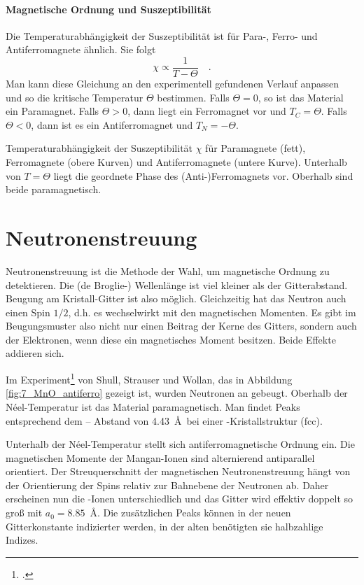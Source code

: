 \paragraph*{Magnetische Ordnung und Suszeptibilität} Die Temperaturabhängigkeit der Suszeptibilität ist für Para-, Ferro- und Antiferromagnete ähnlich. Sie folgt 
\begin{equation}
    \chi \propto \frac{1}{T - \Theta} \quad .
\end{equation}
Man kann diese Gleichung an den experimentell gefundenen Verlauf anpassen und so die kritische Temperatur  $\Theta$ bestimmen. Falls $\Theta = 0$, so ist das Material ein Paramagnet. Falls $\Theta > 0$, dann liegt ein Ferromagnet vor und $T_C = \Theta$. Falls $\Theta < 0$, dann ist es ein Antiferromagnet und $T_N = - \Theta$. 


\begin{marginfigure}
    \caption{Temperaturabhängigkeit der Suszeptibilität $\chi$ für Paramagnete (fett), Ferromagnete (obere Kurven) und Antiferromagnete (untere Kurve). Unterhalb von $T=\Theta$ liegt die geordnete Phase des (Anti-)Ferromagnets vor. Oberhalb sind beide paramagnetisch.}
\end{marginfigure}
    

\section{Neutronenstreuung}

 Neutronenstreuung ist die Methode der Wahl, um magnetische Ordnung zu detektieren. Die (de Broglie-) Wellenlänge ist viel kleiner als der Gitterabstand. Beugung am Kristall-Gitter ist also möglich. Gleichzeitig hat das Neutron auch einen Spin $1/2$, d.h. es wechselwirkt mit den magnetischen Momenten. Es gibt im Beugungsmuster also nicht nur einen Beitrag der Kerne des Gitters, sondern auch der Elektronen, wenn diese ein magnetisches Moment besitzen. Beide Effekte addieren sich.

Im Experiment\footcite{Shull1951} von  Shull, Strauser und Wollan, das in Abbildung \ref{fig:7_MnO_antiferro} gezeigt ist, wurden Neutronen an  gebeugt. Oberhalb der Néel-Temperatur ist das Material paramagnetisch. Man findet Peaks entsprechend dem -- Abstand von 4.43~\AA\ bei einer -Kristallstruktur (fcc).

 Unterhalb der Néel-Temperatur stellt sich antiferromagnetische Ordnung ein. Die magnetischen Momente der Mangan-Ionen sind alternierend antiparallel orientiert. Der Streuquerschnitt der magnetischen Neutronenstreuung hängt von der Orientierung der Spins relativ zur Bahnebene der Neutronen ab. Daher erscheinen nun die -Ionen unterschiedlich und das Gitter wird effektiv doppelt so groß mit $a_0 = 8.85$~\AA . Die zusätzlichen Peaks können in der neuen Gitterkonstante indizierter werden, in der alten benötigten sie halbzahlige Indizes.

